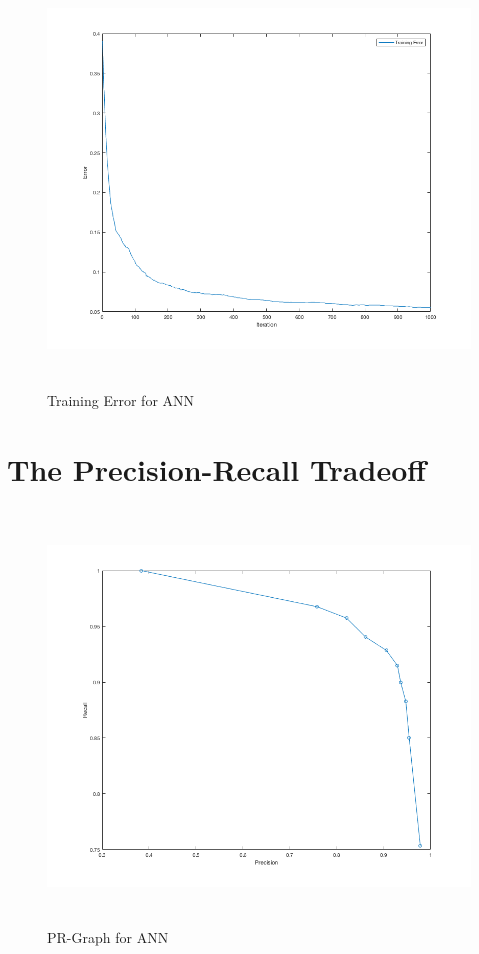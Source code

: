 \documentclass[12pt]{article}
\begin{document}
\begin{figure}[H]
\begin{center}
\includegraphics[height=11cm]{problem1_training_error.png}
\caption{Training Error for ANN}
\end{center}
\end{figure}

\newpage

\section{The Precision-Recall Tradeoff}\label{naive}
\begin{figure}[H]
\begin{center}
\includegraphics[height=11cm]{problem2_PRC.png}
\caption{PR-Graph for ANN}
\end{center}
\end{figure}
\end{document}
